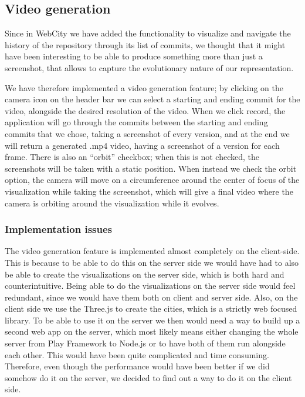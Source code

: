 \documentclass[]{usiinfbachelorproject}
\begin{document}
\subsection{Video generation} \label{Video generation}
Since in WebCity we have added the functionality to visualize and navigate the history of the repository through its list of commits, we thought that it might have been interesting to be able to produce something more than just a screenshot, that allows to capture the evolutionary nature of our representation.

We have therefore implemented a video generation feature; by clicking on the camera icon on the header bar we can select a starting and ending commit for the video, alongside the desired resolution of the video. When we click record, the application will go through the commits between the starting and ending commits that we chose, taking a screenshot of every version, and at the end we will return a generated .mp4 video, having a screenshot of a version for each frame.
There is also an ``orbit'' checkbox; when this is not checked, the screenshots will be taken with a static position. When instead we check the orbit option, the camera will move on a circumference around the center of focus of the visualization while taking the screenshot, which will give a final video where the camera is orbiting around the visualization while it evolves.

\subsubsection{Implementation issues} \label{Implementation issues}

The video generation feature is implemented almost completely on the client-side. This is because to be able to do this on the server side we would have had to also be able to create the visualizations on the server side, which is both hard and counterintuitive. Being able to do the visualizations on the server side would feel redundant, since we would have them both on client and server side.
Also, on the client side we use the Three.js to create the cities, which is a strictly web focused library. To be able to use it on the server we then would need a way to build up a second web app on the server, which most likely means either changing the whole server from Play Framework to Node.js or to have both of them run alongside each other. This would have been quite complicated and time consuming.
Therefore, even though the performance would have been better if we did somehow do it on the server, we decided to find out a way to do it on the client side.
\end{document}
